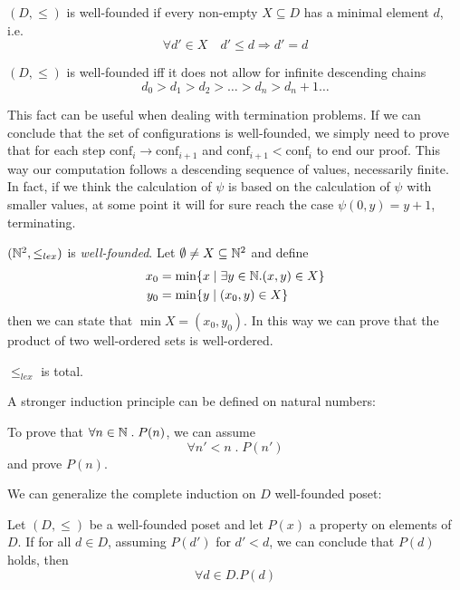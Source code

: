 \begin{definition}
  $(D, \leq)$ is well-founded if every non-empty $X \subseteq D$ has a minimal element $d$, i.e.
  \[  
  \forall d' \in X \quad d' \leq d \Rightarrow d' = d
  \]
\end{definition}

\begin{observation}
  $(D, \leq)$ is well-founded iff it does not allow for
  infinite descending chains
  \[
    d_0 > d_1 > d_2 > \dots > d_n > d_n+1 \dots
  \]
\end{observation}
\newcommand{\conf}{\text{conf}} 
This fact can be useful when dealing
with termination problems. If we can conclude that the set of
configurations is well-founded, we simply need to prove
that for each step \( \conf _i \rightarrow \conf_{i+1} \) and
\( \conf _{i+1} < \conf _i \) to end our proof. This way our computation follows a descending sequence of values, necessarily finite.
In fact, if we think the calculation of $\psi$ is based on the
calculation of $\psi$ with smaller values, at some point it
will for sure reach the case $\psi(0,y) = y + 1$, terminating.

\begin{example}
  $(\mathbb{N}^2, \leq_{lex})$ is \emph{well-founded}.
Let $\emptyset \neq X \subseteq \mathbb{N}^2$ and define
\begin{align*}
  x_0 &= \min\{x \mid \exists y \in \mathbb{N} . (x,y) \in X\} \\
  y_0 &= \min \{ y \; | \; (x_0,y) \in X\}
\end{align*}
then we can state that
$\min X = (x_0, y_0)$. In this way we can prove that the product of
two well-ordered sets is well-ordered.
\end{example}
\begin{observation}
  $\leq_{lex}$ is total.
\end{observation}

A stronger induction principle can be defined on natural numbers:
\begin{definition}
  To prove that $\forall n\in\mathbb{N} \;.\; P(n)$, we can assume 
  \[
    \forall n'<n\;.\; P(n')
    \]
  and prove $P(n)$.
\end{definition}
We can generalize the complete induction on $D$ well-founded poset:
\begin{definition}
  Let $(D, \leq)$ be a well-founded poset and let $P(x)$ a
  property on elements of $D$. If for all $ d \in D $, assuming $P(d')$ for
  $d' < d$, we can conclude that $P(d)$ holds, then
  \[
    \forall d\in D. P(d)
  \]
\end{definition}

